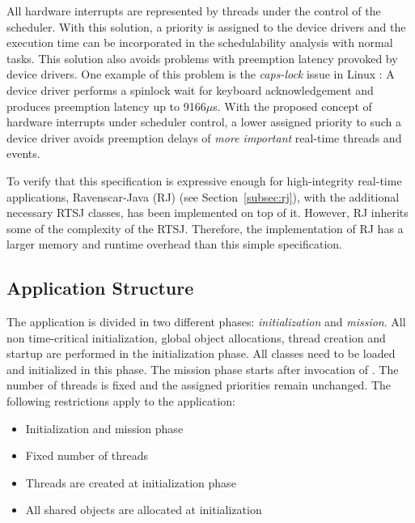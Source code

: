 All hardware interrupts are represented by threads under the control
of the scheduler. With this solution, a priority is assigned to the
device drivers and the execution time can be incorporated in the
schedulability analysis with normal tasks. This solution also avoids
problems with preemption latency provoked by device drivers. One
example of this problem is the \emph{caps-lock} issue in Linux
\cite{REDLinux2003}: A device driver performs a spinlock wait for
keyboard acknowledgement and produces preemption latency up to
9166$\mu$s. With the proposed concept of hardware interrupts under
scheduler control, a lower assigned priority to such a device driver
avoids preemption delays of \emph{more important} real-time threads
and events.


To verify that this specification is expressive enough for
high-integrity real-time applications, Ravenscar-Java (RJ)
\cite{ravenscar:java} (see Section~\ref{subsec:rj}), with the
additional necessary RTSJ classes, has been implemented on top of it.
However, RJ inherits some of the complexity of the RTSJ. Therefore,
the implementation of RJ has a larger memory and runtime overhead
than this simple specification.

\subsection{Application Structure}

The application is divided in two different phases:
\emph{initialization} and \emph{mission}. All non time-critical
initialization, global object allocations, thread creation and
startup are performed in the initialization phase. All classes need
to be loaded and initialized in this phase. The mission phase starts
after invocation of . The number of threads is
fixed and the assigned priorities remain unchanged. The following
restrictions apply to the application:

\begin{itemize}
\item Initialization and mission phase
\item Fixed number of threads
\item Threads are created at initialization phase
\item All shared objects are allocated at initialization
\end{itemize}

